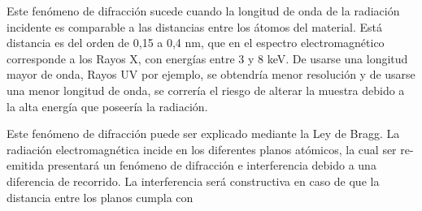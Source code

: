 \documentclass[12pt]{article}
\theoremstyle{definition}
\theoremstyle{remark}
\begin{document}
 Este fenómeno de difracción sucede cuando la longitud de onda de la radiación incidente es comparable a las distancias entre los átomos del material. Está distancia es del orden de 0,15 a 0,4 nm, que en el espectro electromagnético corresponde a los Rayos X, con energías entre 3 y 8 keV. De usarse una longitud mayor de onda, Rayos UV por ejemplo, se obtendría menor resolución y de usarse una menor longitud de onda, se correría el riesgo de alterar la muestra debido a la alta energía que poseería la radiación.
 
 
 Este fenómeno de difracción puede ser explicado mediante la Ley de Bragg. La radiación electromagnética incide en los diferentes planos atómicos, la cual ser re-emitida presentará un fenómeno de difracción e interferencia debido a una diferencia de recorrido. La interferencia será constructiva en caso de que la distancia entre los planos cumpla con
 
\end{document}
